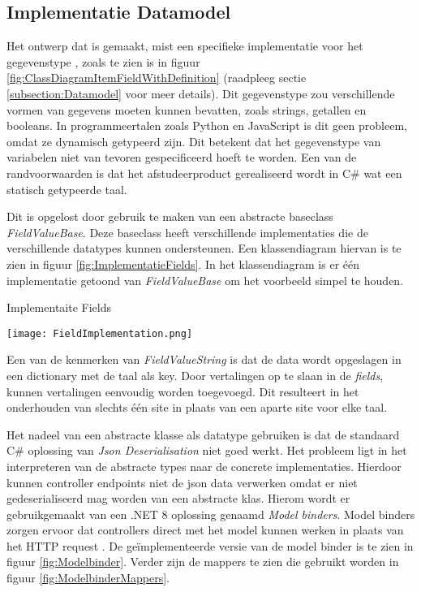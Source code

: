 \subsection{Implementatie Datamodel}
Het ontwerp dat is gemaakt, mist een specifieke implementatie voor het gegevenstype , zoals te zien is in figuur \ref{fig:ClassDiagramItemFieldWithDefinition} (raadpleeg sectie \ref{subsection:Datamodel} voor meer details).
Dit gegevenstype zou verschillende vormen van gegevens moeten kunnen bevatten, zoals strings, getallen en booleans.
In programmeertalen zoals Python en JavaScript is dit geen probleem, omdat ze dynamisch getypeerd zijn.
Dit betekent dat het gegevenstype van variabelen niet van tevoren gespecificeerd hoeft te worden.
Een van de randvoorwaarden is dat het afstudeerproduct gerealiseerd wordt in C\# wat een statisch getypeerde taal.

\whitespace
Dit is opgelost door gebruik te maken van een abstracte baseclass \textit{FieldValueBase}.
Deze baseclass  heeft verschillende implementaties die de verschillende datatypes kunnen ondersteunen.
Een klassendiagram hiervan is te zien in figuur \ref{fig:ImplementatieFields}.
In het klassendiagram is er één implementatie getoond van \textit{FieldValueBase} om het voorbeeld simpel te houden.

\whitespace
\begin{graphic}
    \captionsetup{type=figure}
    \caption{Implementaite Fields}
    \texttt{[image: FieldImplementation.png]}
    \label{fig:ImplementatieFields}
\end{graphic}

\whitespace
Een van de kenmerken van \textit{FieldValueString} is dat de data wordt opgeslagen in een dictionary met de taal als key.
Door vertalingen op te slaan in de \textit{fields}, kunnen vertalingen eenvoudig worden toegevoegd.
Dit resulteert in het onderhouden van slechts één site in plaats van een aparte site voor elke taal.

\whitespace
Het nadeel van een abstracte klasse als datatype gebruiken is dat de standaard C\# oplossing van \textit{Json Deserialisation} niet goed werkt.
Het probleem ligt in het interpreteren van de abstracte types naar de concrete implementaties.
Hierdoor kunnen controller endpoints niet de json data verwerken omdat er niet gedeserialiseerd mag worden van een abstracte klas.
Hierom wordt er gebruikgemaakt van een .NET 8 oplossing genaamd \textit{Model binders}.
Model binders zorgen ervoor dat controllers direct met het model kunnen werken in plaats van het HTTP request \parencite{ModelBinders}.
De geïmplementeerde versie van de model binder is te zien in figuur \ref{fig:Modelbinder}.
Verder zijn de mappers te zien die gebruikt worden in figuur \ref{fig:ModelbinderMappers}.

